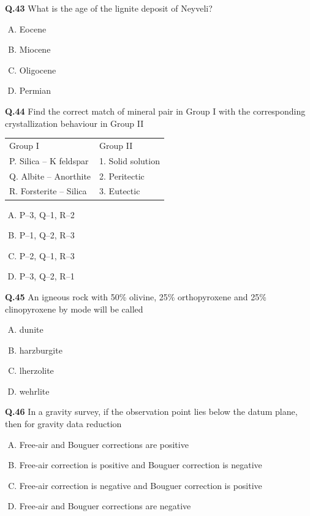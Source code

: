 \textbf{Q.43} What is the age of the lignite deposit of Neyveli?
\begin{enumerate}[(A)]
    \item Eocene
    \item Miocene
    \item Oligocene
    \item Permian
\end{enumerate}

\textbf{Q.44} Find the correct match of mineral pair in Group I with the corresponding crystallization behaviour in Group II  

\begin{center}
\begin{tabular}{ll}
Group I & Group II \\
P. Silica -- K feldspar & 1. Solid solution \\
Q. Albite -- Anorthite & 2. Peritectic \\
R. Forsterite -- Silica & 3. Eutectic \\
\end{tabular}
\end{center}

\begin{enumerate}[(A)]
    \item P--3, Q--1, R--2
    \item P--1, Q--2, R--3
    \item P--2, Q--1, R--3
    \item P--3, Q--2, R--1
\end{enumerate}

\textbf{Q.45} An igneous rock with 50\% olivine, 25\% orthopyroxene and 25\% clinopyroxene by mode will be called
\begin{enumerate}[(A)]
    \item dunite
    \item harzburgite
    \item lherzolite
    \item wehrlite
\end{enumerate}

\textbf{Q.46} In a gravity survey, if the observation point lies below the datum plane, then for gravity data reduction
\begin{enumerate}[(A)]
    \item Free-air and Bouguer corrections are positive
    \item Free-air correction is positive and Bouguer correction is negative
    \item Free-air correction is negative and Bouguer correction is positive
    \item Free-air and Bouguer corrections are negative
\end{enumerate}


